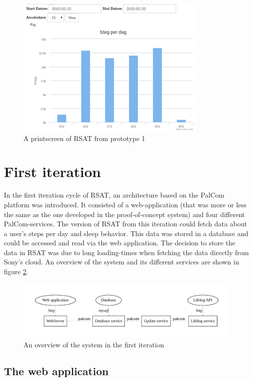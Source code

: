 \documentclass{cslthse-msc}
\begin{document}
\begin{figure}[!hbt]
\centering
\includegraphics[scale=0.8]{first_prototype_screenshot_crop2.png} 
\caption{A printscreen of RSAT from prototype 1}\label{fig:firstV_screen}
\end{figure}


\section{First iteration}
In the first iteration cycle of RSAT, an architecture based on the PalCom platform was introduced.  It consisted of a web-application (that was more or less the same as the one developed in the proof-of-concept system) and four different PalCom-services. The version of RSAT from this iteration could fetch data about a user’s steps per day and sleep behavior. This data was stored in a database and could be accessed and read via the web application. The decision to store the data in RSAT was due to long loading-times when fetching the data directly from Sony's cloud.
An overview of the system and its different services are shown in figure \ref{fig:second-version}.  


\begin{figure}[!hbt]
\centering
\includegraphics[scale=0.6]{second-version.pdf} 
\caption{An overview of the system in the first iteration}\label{fig:second-version}
\end{figure}

\subsection{The web application}
\end{document}
